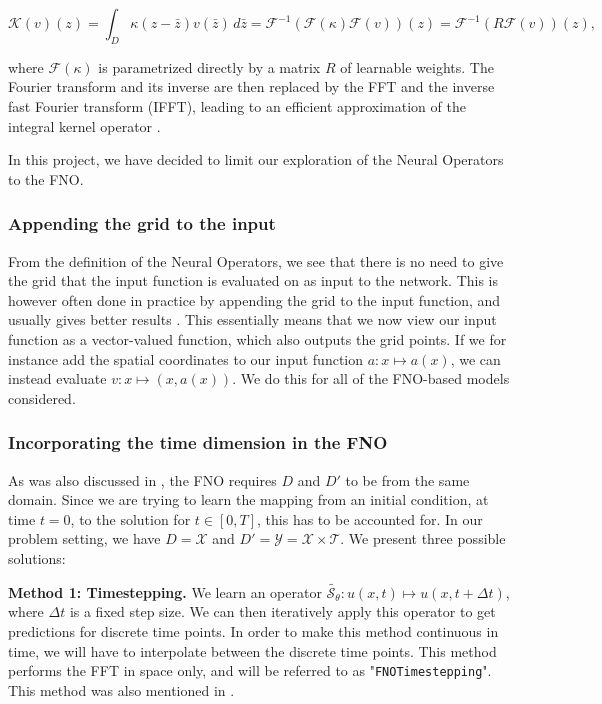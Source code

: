 \begin{equation}
    \mathcal{K}(v)(z) 
    = \int_D \kappa(z-\bar{z} ) v(\bar{z} ) \, d\bar{z} 
    = \mathcal{F}^{-1} (\mathcal{F}(\kappa) \mathcal{F}(v))(z)
    = \mathcal{F}^{-1} (R \mathcal{F}(v))(z),
\end{equation}

where \(\mathcal{F}(\kappa)\) is parametrized directly by a matrix \(R\) of learnable weights.
The Fourier transform and its inverse are then replaced by the FFT and the inverse fast Fourier transform (IFFT), leading to an efficient approximation of the integral kernel operator .

In this project, we have decided to limit our exploration of the Neural Operators to the FNO.

\subsubsection{Appending the grid to the input}\label{sec:appending_grid}

From the definition of the Neural Operators, we see that there is no need to give the grid that the input function is evaluated on as input to the network.
This is however often done in practice by appending the grid to the input function, and usually gives better results .
This essentially means that we now view our input function as a vector-valued function, which also outputs the grid points.
If we for instance add the spatial coordinates to our input function \(a : x \mapsto a(x)\), we can instead evaluate \(v : x \mapsto (x, a(x))\).
We do this for all of the FNO-based models considered.

\subsubsection{Incorporating the time dimension in the FNO}

As was also discussed in , the FNO requires \(D\) and \(D'\) to be from the same domain.
Since we are trying to learn the mapping from an initial condition, at time \(t=0\), to the solution for \(t \in [0, T]\), this has to be accounted for.
In our problem setting, we have \(D = \mathcal{X}\) and \(D' = \mathcal{Y} = \mathcal{X} \times \mathcal{T}\).
We present three possible solutions:

\textbf{Method 1: Timestepping.} We learn an operator \(\tilde{\mathcal{S}_\theta} : u(x, t) \mapsto u(x,t + \Delta t)\),
where \(\Delta t\) is a fixed step size. We can then iteratively apply this operator to get predictions for discrete time points.
In order to make this method continuous in time, we will have to interpolate between the discrete time points.
This method performs the FFT in space only, and will be referred to as "\texttt{FNOTimestepping}". This method was also mentioned 
in .


